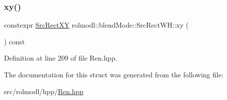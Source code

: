 \subsubsection{\texorpdfstring{xy()}{xy()}}
{\footnotesize\ttfamily constexpr \mbox{\hyperlink{structrolmodl_1_1blend_mode_1_1_src_rect_x_y}{Src\+Rect\+XY}} rolmodl\+::blend\+Mode\+::\+Src\+Rect\+W\+H\+::xy (\begin{DoxyParamCaption}{ }\end{DoxyParamCaption}) const\hspace{0.3cm}{\ttfamily [noexcept]}}



Definition at line 209 of file Ren.\+hpp.



The documentation for this struct was generated from the following file\+:\begin{DoxyCompactItemize}
\item 
src/rolmodl/hpp/\mbox{\hyperlink{_ren_8hpp}{Ren.\+hpp}}\end{DoxyCompactItemize}
